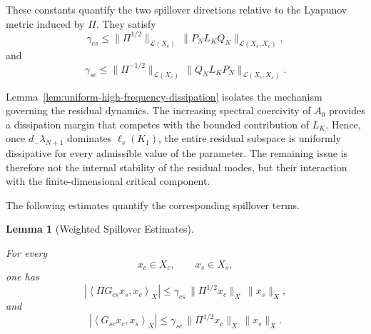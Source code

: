 \documentclass[pdflatex,sn-mathphys-num]{sn-jnl}
\theoremstyle{thmstyleone}%
\theoremstyle{thmstyletwo}%
\theoremstyle{thmstylethree}%
\newtheorem{lemma}{Lemma}
\begin{document}
These constants quantify the two spillover directions relative to the Lyapunov metric induced by \(\Pi\). They satisfy
\begin{equation}
\gamma_{cs}
\le
\|\Pi^{1/2}\|_{\mathcal L(X_c)}
\,
\|P_NL_KQ_N\|_{\mathcal L(X_s,X_c)},
\label{eq:gamma-cs-computable-bound}
\end{equation}
and
\begin{equation}
\gamma_{sc}
\le
\|\Pi^{-1/2}\|_{\mathcal L(X_c)}
\,
\|Q_NL_KP_N\|_{\mathcal L(X_c,X_s)}.
\label{eq:gamma-sc-computable-bound}
\end{equation}

Lemma~\ref{lem:uniform-high-frequency-dissipation} isolates the mechanism governing the residual dynamics. The increasing spectral coercivity of \(A_0\) provides a dissipation margin that competes with the bounded contribution of \(L_K\). Hence, once \(d_-\lambda_{N+1}\) dominates \(\ell_s(K_1)\), the entire residual
subspace is uniformly dissipative for every admissible value of the parameter. The remaining issue is therefore not the internal stability of the residual modes, but their interaction with the finite-dimensional critical component.

The following estimates quantify the corresponding spillover terms.

\begin{lemma}[Weighted Spillover Estimates]
\label{lem:weighted-spillover-estimates}

For every
\[
x_c\in X_c,
\qquad
x_s\in X_s,
\]
one has
\begin{equation}
\left|
\left\langle
\Pi G_{cs}x_s,x_c
\right\rangle_X
\right|
\le
\gamma_{cs}
\,
\|\Pi^{1/2}x_c\|_X
\,
\|x_s\|_X,
\label{eq:weighted-critical-to-residual-estimate}
\end{equation}
and
\begin{equation}
\left|
\left\langle
G_{sc}x_c,x_s
\right\rangle_X
\right|
\le
\gamma_{sc}
\,
\|\Pi^{1/2}x_c\|_X
\,
\|x_s\|_X.
\label{eq:weighted-residual-to-critical-estimate}
\end{equation}

\end{lemma}
\end{document}
